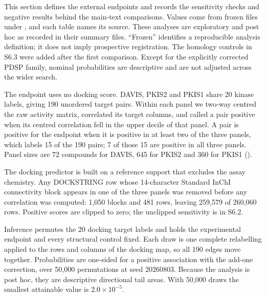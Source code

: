 
This section defines the external endpoints and records the sensitivity checks and negative
results behind the main-text comparisons. Values come from frozen files under ,
and each table names its source. These analyses are exploratory and post hoc as recorded in their
summary files. ``Frozen'' identifies a reproducible analysis definition; it does not imply
prospective registration. The homology controls in S6.3 were added after the first comparison.
Except for the explicitly corrected PDSP family, nominal probabilities are descriptive and are
not adjusted across the wider search.


The endpoint uses no docking score. DAVIS, PKIS2 and PKIS1 share 20 kinase labels, giving 190
unordered target pairs. Within each panel we two-way centred the raw activity matrix, correlated
its target columns, and called a pair positive when its centred correlation fell in the upper
decile of that panel. A pair is positive for the endpoint when it is positive in at least two of
the three panels, which labels 15 of the 190 pairs; 7 of those 15 are positive in all three
panels. Panel sizes are 72 compounds for DAVIS, 645 for PKIS2 and 360 for PKIS1
().

The docking predictor is built on a reference support that excludes the assay chemistry. Any
DOCKSTRING row whose 14-character Standard InChI connectivity block appears in one of the three
panels was removed before any correlation was computed: 1{,}050 blocks and 481 rows, leaving
259{,}579 of 260{,}060 rows. Positive scores are clipped to zero; the unclipped sensitivity is in
S6.2.

Inference permutes the 20 docking target labels and holds the experimental endpoint and every
structural control fixed. Each draw is one complete relabelling applied to the rows and columns
of the docking map, so all 190 edges move together. Probabilities are one-sided for a positive
association with the add-one correction, over 50{,}000 permutations at seed 20260803. Because
the analysis is post hoc, they are descriptive directional tail areas. With
50{,}000 draws the smallest attainable value is $2.0\times10^{-5}$.

